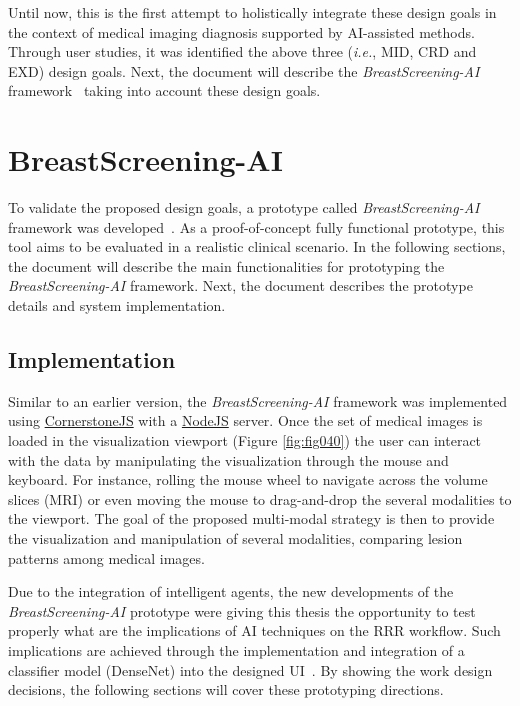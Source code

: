 \vspace{1.50mm}

Until now, this is the first attempt to holistically integrate these design goals in the context of medical imaging diagnosis supported by \ac{AI}-assisted methods.
Through user studies, it was identified the above three ({\it i.e.}, \ac{MID}, \ac{CRD} and \ac{EXD}) design goals.
Next, the document will describe the {\it BreastScreening-AI} framework~\cite{CALISTO2021102607} taking into account these design goals.

\section{BreastScreening-AI}
\label{sec:chap005004}

To validate the proposed design goals, a prototype called {\it BreastScreening-AI} framework was developed~\cite{CALISTO2021102607}.
As a proof-of-concept fully functional prototype, this tool aims to be evaluated in a realistic clinical scenario.
In the following sections, the document will describe the main functionalities for prototyping the {\it BreastScreening-AI} framework.
Next, the document describes the prototype details and system implementation.

\subsection{Implementation}
\label{sec:chap005004001}

Similar to an earlier version, the {\it BreastScreening-AI} framework was implemented using \href{https://cornerstonejs.org/}{CornerstoneJS} with a \href{https://nodejs.org/}{NodeJS} server.
Once the set of medical images is loaded in the visualization viewport (Figure \ref{fig:fig040}) the user can interact with the data by manipulating the visualization through the mouse and keyboard.
For instance, rolling the mouse wheel to navigate across the volume slices (\acs{MRI}) or even moving the mouse to drag-and-drop the several modalities to the viewport.
The goal of the proposed multi-modal strategy is then to provide the visualization and manipulation of several modalities, comparing lesion patterns among medical images.

Due to the integration of intelligent agents, the new developments of the {\it BreastScreening-AI} prototype were giving this thesis the opportunity to test properly what are the implications of \ac{AI} techniques on the \ac{RRR} workflow.
Such implications are achieved through the implementation and integration of a classifier model (DenseNet) into the designed \ac{UI}~\cite{maicas2018training}.
By showing the work design decisions, the following sections will cover these prototyping directions.

